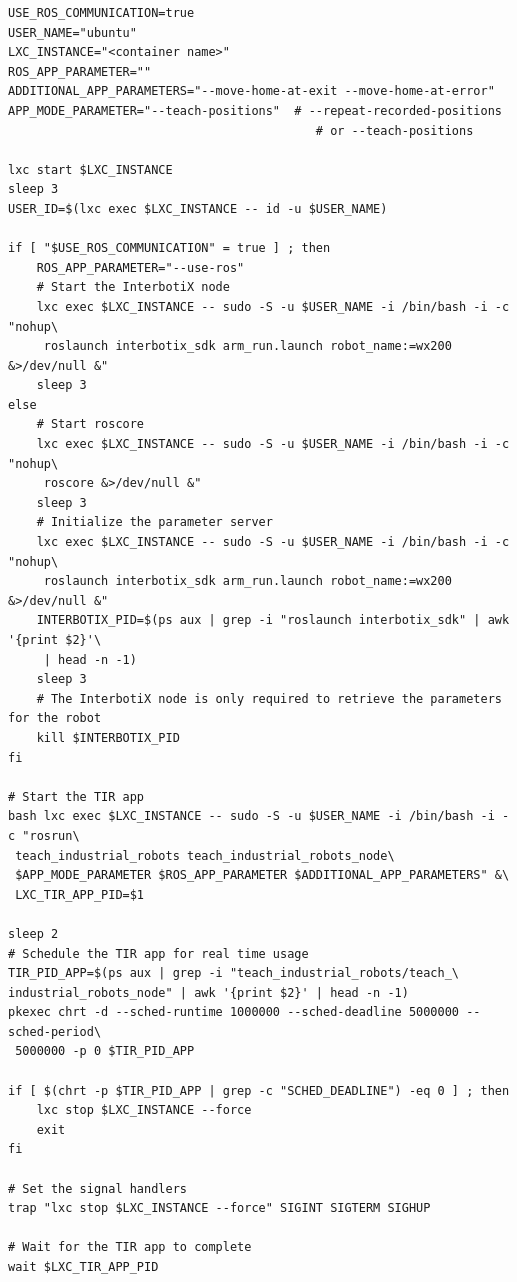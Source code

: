 \begin{lstlisting}[style=bash, caption={Script zum Starten der Roboter-Gesten-Anwendung}, label={lst:start_script_for_app}]
USE_ROS_COMMUNICATION=true
USER_NAME="ubuntu"
LXC_INSTANCE="<container name>"
ROS_APP_PARAMETER=""
ADDITIONAL_APP_PARAMETERS="--move-home-at-exit --move-home-at-error"
APP_MODE_PARAMETER="--teach-positions"  # --repeat-recorded-positions
                                           # or --teach-positions

lxc start $LXC_INSTANCE
sleep 3
USER_ID=$(lxc exec $LXC_INSTANCE -- id -u $USER_NAME)

if [ "$USE_ROS_COMMUNICATION" = true ] ; then
    ROS_APP_PARAMETER="--use-ros"
    # Start the InterbotiX node
    lxc exec $LXC_INSTANCE -- sudo -S -u $USER_NAME -i /bin/bash -i -c "nohup\
     roslaunch interbotix_sdk arm_run.launch robot_name:=wx200 &>/dev/null &"
    sleep 3
else
    # Start roscore
    lxc exec $LXC_INSTANCE -- sudo -S -u $USER_NAME -i /bin/bash -i -c "nohup\
     roscore &>/dev/null &"
    sleep 3
    # Initialize the parameter server
    lxc exec $LXC_INSTANCE -- sudo -S -u $USER_NAME -i /bin/bash -i -c "nohup\
     roslaunch interbotix_sdk arm_run.launch robot_name:=wx200 &>/dev/null &"
    INTERBOTIX_PID=$(ps aux | grep -i "roslaunch interbotix_sdk" | awk '{print $2}'\
     | head -n -1)
    sleep 3
    # The InterbotiX node is only required to retrieve the parameters for the robot
    kill $INTERBOTIX_PID
fi

# Start the TIR app
bash lxc exec $LXC_INSTANCE -- sudo -S -u $USER_NAME -i /bin/bash -i -c "rosrun\
 teach_industrial_robots teach_industrial_robots_node\
 $APP_MODE_PARAMETER $ROS_APP_PARAMETER $ADDITIONAL_APP_PARAMETERS" &\
 LXC_TIR_APP_PID=$1

sleep 2
# Schedule the TIR app for real time usage
TIR_PID_APP=$(ps aux | grep -i "teach_industrial_robots/teach_\
industrial_robots_node" | awk '{print $2}' | head -n -1)
pkexec chrt -d --sched-runtime 1000000 --sched-deadline 5000000 --sched-period\
 5000000 -p 0 $TIR_PID_APP

if [ $(chrt -p $TIR_PID_APP | grep -c "SCHED_DEADLINE") -eq 0 ] ; then
    lxc stop $LXC_INSTANCE --force
    exit
fi

# Set the signal handlers
trap "lxc stop $LXC_INSTANCE --force" SIGINT SIGTERM SIGHUP

# Wait for the TIR app to complete
wait $LXC_TIR_APP_PID
\end{lstlisting}


